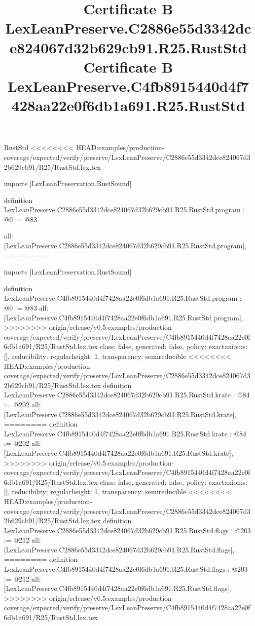 \begin{lexlean}{RustStd}
<<<<<<<< HEAD:examples/production-coverage/expected/verify/preserve/LexLeanPreserve/C2886e55d3342dce824067d32b629cb91/R25/RustStd.lex.tex
\title{Certificate B LexLeanPreserve.C2886e55d3342dce824067d32b629cb91.R25.RustStd}
\begin{coremodule}
imports [LexLeanPreservation.RustSound]

definition LexLeanPreserve.C2886e55d3342dce824067d32b629cb91.R25.RustStd.program : @0 := @83 {
  all: [LexLeanPreserve.C2886e55d3342dce824067d32b629cb91.R25.RustStd.program],
========
\title{Certificate B LexLeanPreserve.C4fb8915440d4f7428aa22e0f6db1a691.R25.RustStd}
\begin{coremodule}
imports [LexLeanPreservation.RustSound]

definition LexLeanPreserve.C4fb8915440d4f7428aa22e0f6db1a691.R25.RustStd.program : @0 := @83 {
  all: [LexLeanPreserve.C4fb8915440d4f7428aa22e0f6db1a691.R25.RustStd.program],
>>>>>>>> origin/release/v0.5:examples/production-coverage/expected/verify/preserve/LexLeanPreserve/C4fb8915440d4f7428aa22e0f6db1a691/R25/RustStd.lex.tex
  class: false,
  generated: false,
  policy: exact{axioms: []},
  reducibility: regular{height: 1},
  transparency: semireducible
}
<<<<<<<< HEAD:examples/production-coverage/expected/verify/preserve/LexLeanPreserve/C2886e55d3342dce824067d32b629cb91/R25/RustStd.lex.tex
definition LexLeanPreserve.C2886e55d3342dce824067d32b629cb91.R25.RustStd.krate : @84 := @202 {
  all: [LexLeanPreserve.C2886e55d3342dce824067d32b629cb91.R25.RustStd.krate],
========
definition LexLeanPreserve.C4fb8915440d4f7428aa22e0f6db1a691.R25.RustStd.krate : @84 := @202 {
  all: [LexLeanPreserve.C4fb8915440d4f7428aa22e0f6db1a691.R25.RustStd.krate],
>>>>>>>> origin/release/v0.5:examples/production-coverage/expected/verify/preserve/LexLeanPreserve/C4fb8915440d4f7428aa22e0f6db1a691/R25/RustStd.lex.tex
  class: false,
  generated: false,
  policy: exact{axioms: []},
  reducibility: regular{height: 1},
  transparency: semireducible
}
<<<<<<<< HEAD:examples/production-coverage/expected/verify/preserve/LexLeanPreserve/C2886e55d3342dce824067d32b629cb91/R25/RustStd.lex.tex
definition LexLeanPreserve.C2886e55d3342dce824067d32b629cb91.R25.RustStd.flags : @203 := @212 {
  all: [LexLeanPreserve.C2886e55d3342dce824067d32b629cb91.R25.RustStd.flags],
========
definition LexLeanPreserve.C4fb8915440d4f7428aa22e0f6db1a691.R25.RustStd.flags : @203 := @212 {
  all: [LexLeanPreserve.C4fb8915440d4f7428aa22e0f6db1a691.R25.RustStd.flags],
>>>>>>>> origin/release/v0.5:examples/production-coverage/expected/verify/preserve/LexLeanPreserve/C4fb8915440d4f7428aa22e0f6db1a691/R25/RustStd.lex.tex
}}}
\end{coremodule}}
\end{coremodule}
\end{lexlean}
